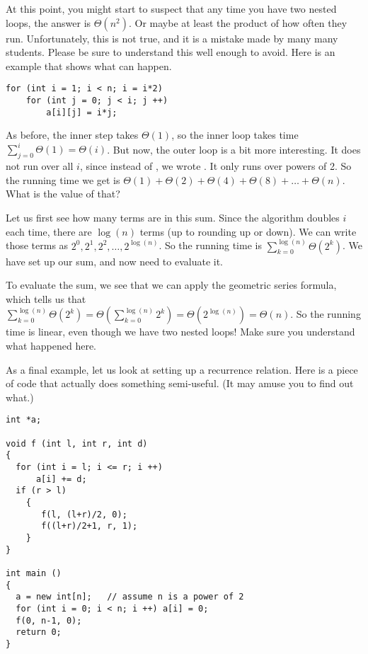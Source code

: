\smallskip

At this point, you might start to suspect that any time you have two
nested loops, the answer is $\Theta(n^2)$. Or maybe at least the
product of how often they run.
Unfortunately, this is not true, and it is a mistake made by many many
students.
Please be sure to understand this well enough to avoid.
Here is an example that shows what can happen.

\begin{verbatim}
for (int i = 1; i < n; i = i*2)
    for (int j = 0; j < i; j ++)
        a[i][j] = i*j;
\end{verbatim}

As before, the inner step takes $\Theta(1)$,
so the inner loop takes time $\sum_{j=0}^i \Theta(1) = \Theta(i)$. 
But now, the outer loop is a bit more interesting.
It does not run over all $i$, since instead of , we wrote
. It only runs over powers of 2.
So the running time we get is
$\Theta(1) + \Theta(2) + \Theta(4) + \Theta(8) + \ldots + \Theta(n)$.
What is the value of that?

Let us first see how many terms are in this sum.
Since the algorithm doubles $i$ each time,
there are $\log(n)$ terms (up to rounding up or down).
We can write those terms as $2^0, 2^1, 2^2, \ldots, 2^{\log(n)}$.
So the running time is $\sum_{k=0}^{\log(n)} \Theta(2^k)$.
We have set up our sum, and now need to evaluate it.

To evaluate the sum, we see that we can apply the geometric series formula,
which tells us that
$\sum_{k=0}^{\log(n)} \Theta(2^k) = 
\Theta(\sum_{k=0}^{\log(n)} 2^k) = \Theta(2^{\log(n)}) = \Theta(n)$.
So the running time is linear, even though we have two nested loops!
Make sure you understand what happened here. 

\smallskip

As a final example, let us look at setting up a recurrence relation.
Here is a piece of code that actually does something semi-useful.
(It may amuse you to find out what.)

\begin{verbatim}
int *a;

void f (int l, int r, int d)
{
  for (int i = l; i <= r; i ++)
      a[i] += d;
  if (r > l)
    {
       f(l, (l+r)/2, 0);
       f((l+r)/2+1, r, 1);
    }
}

int main ()
{
  a = new int[n];   // assume n is a power of 2
  for (int i = 0; i < n; i ++) a[i] = 0;
  f(0, n-1, 0);
  return 0;
}
\end{verbatim}

